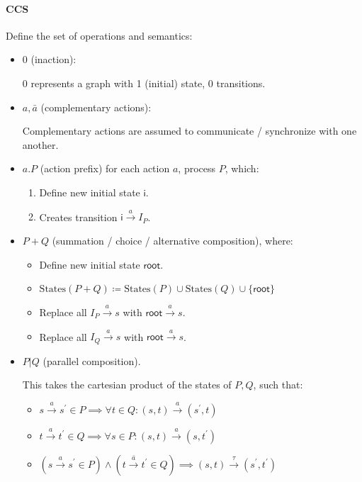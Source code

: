 \documentclass[99-notes-packed.tex]{subfiles}
\begin{document}
\paragraph*{CCS}
Define the set of operations and semantics: 
\begin{itemize}
    \item {
        $0$ (inaction): 
        
        $0$ represents a graph with 1 (initial) state, 0 transitions.
    }
    \item {
        $a, \bar{a}$ (complementary actions): 

        Complementary actions are assumed to communicate / synchronize with one another. 
    }
    \item {
        $a.P$ (action prefix) for each action $a$, process $P$, which:  
        \begin{enumerate}
            \item Define new initial state $\mathsf{i}$.
            \item Creates transition $\mathsf{i} \xrightarrow{a} I_P$.
        \end{enumerate}
    }
    \item {
        $P + Q$ (summation / choice / alternative composition), where: 
        \begin{itemize}
            \item Define new initial state $\mathsf{root}$.
            \item $\mathrm{States}(P + Q) \coloneqq \mathrm{States}(P) \cup \mathrm{States}(Q) \cup \{\mathsf{root}\}$
            \item Replace all $I_P \xrightarrow{a} s$ with $\mathsf{root} \xrightarrow{a} s$. 
            \item Replace all $I_Q \xrightarrow{a} s$ with $\mathsf{root} \xrightarrow{a} s$.
        \end{itemize}
    }
    \item {
        $P | Q$ (parallel composition).

        This takes the cartesian product of the states of $P, Q$, such that: 
        \begin{itemize}
            \item $s \xrightarrow{a} s^{'} \in P \implies \forall t \in Q: (s, t) \xrightarrow{a} (s^{'}, t)$
            \item $t \xrightarrow{a} t^{'} \in Q \implies \forall s \in P: (s, t) \xrightarrow{a} (s, t^{'})$
            \item $(s \xrightarrow{a} s^{'} \in P) \wedge (t \xrightarrow{\bar{a}} t^{'} \in Q) \implies (s, t) \xrightarrow{\tau} (s^{'}, t^{'})$
        \end{itemize}

}
\end{itemize}
\end{document}
